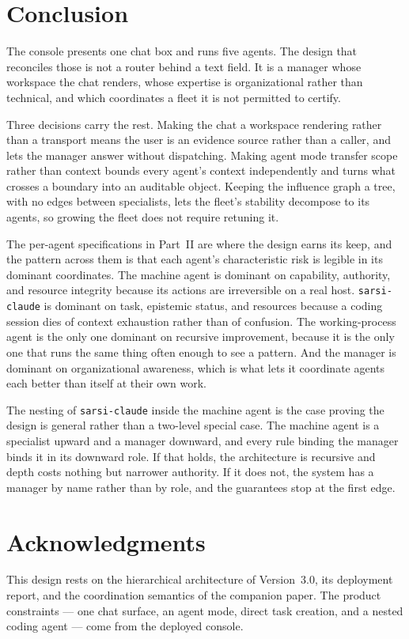 \documentclass[11pt]{article}
\newcommand{\code}[1]{\texttt{\small #1}}
\begin{document}
\section{Conclusion}
\label{sec:conclusion}

The console presents one chat box and runs five agents. The design that reconciles those is not a router behind a text field. It is a manager whose workspace the chat renders, whose expertise is organizational rather than technical, and which coordinates a fleet it is not permitted to certify.

Three decisions carry the rest. Making the chat a workspace rendering rather than a transport means the user is an evidence source rather than a caller, and lets the manager answer without dispatching. Making agent mode transfer scope rather than context bounds every agent's context independently and turns what crosses a boundary into an auditable object. Keeping the influence graph a tree, with no edges between specialists, lets the fleet's stability decompose to its agents, so growing the fleet does not require retuning it.

The per-agent specifications in Part~II are where the design earns its keep, and the pattern across them is that each agent's characteristic risk is legible in its dominant coordinates. The machine agent is dominant on capability, authority, and resource integrity because its actions are irreversible on a real host. \code{sarsi-claude} is dominant on task, epistemic status, and resources because a coding session dies of context exhaustion rather than of confusion. The working-process agent is the only one dominant on recursive improvement, because it is the only one that runs the same thing often enough to see a pattern. And the manager is dominant on organizational awareness, which is what lets it coordinate agents each better than itself at their own work.

The nesting of \code{sarsi-claude} inside the machine agent is the case proving the design is general rather than a two-level special case. The machine agent is a specialist upward and a manager downward, and every rule binding the manager binds it in its downward role. If that holds, the architecture is recursive and depth costs nothing but narrower authority. If it does not, the system has a manager by name rather than by role, and the guarantees stop at the first edge.

\section*{Acknowledgments}
This design rests on the hierarchical architecture of Version~3.0, its deployment report, and the coordination semantics of the companion paper. The product constraints --- one chat surface, an agent mode, direct task creation, and a nested coding agent --- come from the deployed console.
\end{document}
